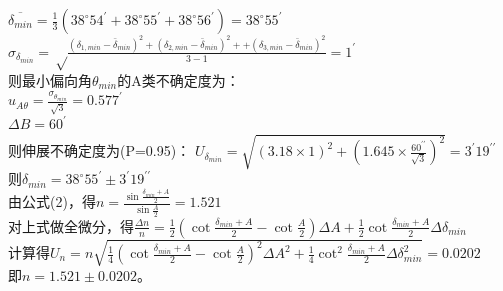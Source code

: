 \documentclass[12pt,a4paper]{article}
\begin{document}
	 $\overline{\delta_{min}}=\frac{1}{3}(38^{\circ}54^{\prime}+38^{\circ}55^{\prime}+38^{\circ}56^{\prime})=38^{\circ}55^{\prime}$\\
	 $\sigma_{\delta_{min}}=\sqrt \frac{(\delta_{1,min}-\bar \delta_{min})^2+(\delta_{2,min}-\bar \delta_{min})^2++(\delta_{3,min}-\bar \delta_{min})^2}{3-1}=1^{\prime}$\\
	 则最小偏向角$\theta_{min}$的A类不确定度为：\\
	 $u_{A\theta}=\frac{\sigma_{\theta_{min}}}{\sqrt{3}}=0.577^{\prime}$\\
	 $\Delta B=60^{\prime}$\\
	 则伸展不确定度为(P=0.95)：
	 $U_{\delta_{min}}=\sqrt {(3.18\times 1)^2+(1.645\times \frac{60^{\prime \prime}}{\sqrt 3})^2}=3^{\prime}19^{\prime \prime} $\\
	 则$\delta_{min}=38^{\circ}55^{\prime} \pm 3^{\prime}19^{\prime \prime}$\\
	 由公式(2)，得$ n=\frac{\sin\frac{\delta _{min}+A}{2}}{\sin\frac {A}{2}}=1.521$\\
	 对上式做全微分，得$\frac{\Delta n}{n}=\frac{1}{2}(\cot\frac{\delta _{min}+A}{2}-\cot\frac A 2)\Delta A+\frac{1}{2} \cot\frac{\delta _{min}+A}{2}\Delta \delta_{min}$\\
	 计算得$U_{n}=n\sqrt{\frac{ 1 }{4}(\cot\frac{\delta _{min}+A}{2}-\cot\frac{ A }{2})^2\Delta A^2+\frac {1} {4} \cot^2\frac{\delta _{min}+A}{2}\Delta \delta_{min}^2}=0.0202$\\
	 即$n=1.521 \pm 0.0202$。
	 
\end{document}
